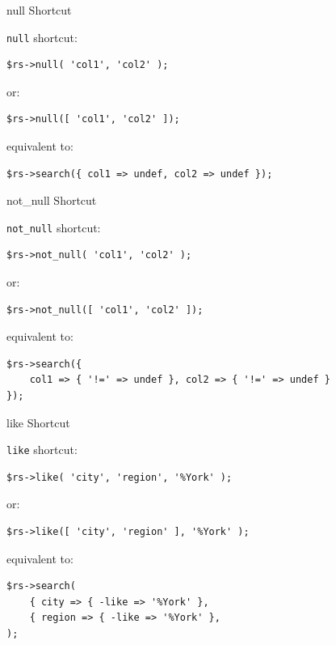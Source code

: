 
\begin{frame}[fragile]{null Shortcut}

\verb|null| shortcut:

\begin{lstlisting}
$rs->null( 'col1', 'col2' );
\end{lstlisting}

or:

\begin{lstlisting}
$rs->null([ 'col1', 'col2' ]);
\end{lstlisting}

equivalent to:

\begin{lstlisting}
$rs->search({ col1 => undef, col2 => undef });
\end{lstlisting}
\end{frame}


\begin{frame}[fragile]{not\_null Shortcut}

\verb|not_null| shortcut:

\begin{lstlisting}
$rs->not_null( 'col1', 'col2' );
\end{lstlisting}

or:

\begin{lstlisting}
$rs->not_null([ 'col1', 'col2' ]);
\end{lstlisting}

equivalent to:

\begin{lstlisting}
$rs->search({
    col1 => { '!=' => undef }, col2 => { '!=' => undef }
});
\end{lstlisting}
\end{frame}


\begin{frame}[fragile]{like Shortcut}

\verb|like| shortcut:

\begin{lstlisting}
$rs->like( 'city', 'region', '%York' );
\end{lstlisting}

or:

\begin{lstlisting}
$rs->like([ 'city', 'region' ], '%York' );
\end{lstlisting}

equivalent to:

\begin{lstlisting}
$rs->search(
    { city => { -like => '%York' },
    { region => { -like => '%York' },
);
\end{lstlisting}
\end{frame}

